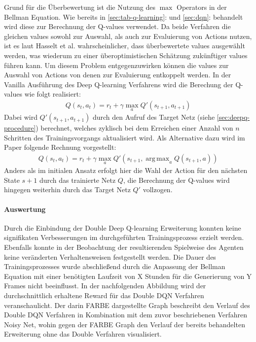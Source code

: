 \documentclass[11pt]{scrartcl}
\DeclareMathOperator*{\argmax}{arg\,max}
\begin{document}
Grund für die Überbewertung ist die Nutzung des $\max$ Operators in der Bellman Equation.
Wie bereits in \autoref{sec:tab-q-learning}: und \autoref{sec:dqn}:
 behandelt wird diese zur Berechnung der Q-values verwendet. Da beide
Verfahren die gleichen values sowohl zur Auswahl, als auch zur Evaluierung von Actions nutzen,
ist es laut Hasselt et al.\cite[~S.2]{HGD2015} wahrscheinlicher, dass überbewertete values
ausgewählt werden, was wiederum zu einer überoptimistischen Schätzung zu\-künf\-ti\-ger values
führen kann. Um diesem Problem entgegenzuwirken können die values zur Auswahl von Actions von
denen zur Evaluierung entkoppelt werden. In der Vanilla Ausführung des Deep Q-learning
Verfahrens wird die Berechung der Q-values wie folgt realisiert:
\begin{align}
Q(s_t, a_t) = r_t + \gamma\max_{a}Q'(s_{t+1},a_{t+1})
\label{aln:double-dqn-q-values}
\end{align}
Dabei wird $Q'(s_{t+1}, a_{t+1})$ durch den Aufruf des Target Netz (siehe 
\autoref{sec:deepq-procedure}) berechnet, welches zyklisch bei dem Erreichen einer Anzahl von
$n$ Schritten des Trainingsvorgangs aktualisiert wird. Als Alternative dazu wird im Paper
folgende Rechnung vorgestellt:
\begin{align}
Q(s_t, a_t) = r_t + \gamma\max_{a}Q'(s_{t+1},\argmax_{a}Q(s_{t+1},a))
\label{aln:double-dqn-q-values-improved}
\end{align}
Anders als im initialen Ansatz erfolgt hier die Wahl der Action für den nächsten State $s+1$
durch das trainierte Netz $Q$, die Berechnung der Q-values wird hingegen weiterhin durch das
Target Netz $Q'$ vollzogen.

\paragraph*{Auswertung}
\noindent
\newline
Durch die Einbindung der Double Deep Q-learning Erweiterung konnten keine signifikaten
Verbesserungen im durchgeführten Trainingsprozess erzielt werden. Ebenfalls konnte in der
Beobachtung der resultierenden Spielweise des Agenten keine veränderten Verhaltensweisen
festgestellt werden. Die Dauer des Trainingsprozesses wurde abschließend durch die Anpassung
der Bellman Equation mit einer benötigten Laufzeit von X Stunden für die Generierung von Y %
Frames nicht beeinflusst. In der nachfolgenden Abbildung wird der durchschnittlich erhaltene
Reward für das Double DQN Verfahren veranschaulicht. Der darin FARBE dargestellte Graph
beschreibt den Verlauf des Double DQN Verfahren in Kombination mit dem zuvor beschriebenen
Verfahren Noisy Net, wohin gegen der FARBE Graph den Verlauf der bereits behandelten
Erweiterung ohne das Double Verfahren visualisiert.
\end{document}
